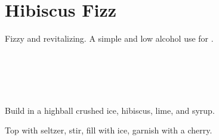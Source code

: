 \section[Hibiscus Fizz]{
    Hibiscus Fizz
}\label{hibiscus_fizz}

\begin{recipestats}[
        servings=1,
        preptime=5~\minute,
        original=Mike \& Jane,
    ]
\end{recipestats}

\begin{recipeabstract}
    Fizzy and revitalizing.
    A simple and low alcohol use for .
\end{recipeabstract}

\begin{ingredientcolumns}
    \begin{ingredientblock}
        \\
        \\
    \end{ingredientblock}
    \begin{ingredientblock}
        \\
    \end{ingredientblock}
\end{ingredientcolumns}

\begin{preparation}
\item Build in a highball crushed ice, hibiscus, lime, and syrup.
\item Top with seltzer, stir, fill with ice, garnish with a cherry.
\end{preparation}

\recipeend%
